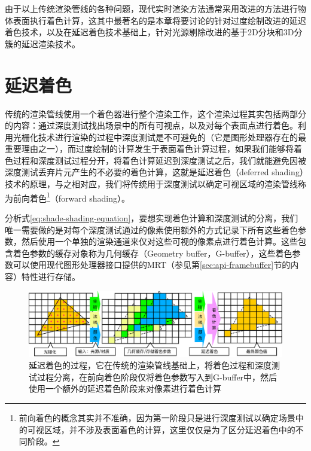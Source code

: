 由于以上传统渲染管线的各种问题，现代实时渲染方法通常采用改进的方法进行物体表面执行着色计算，这其中最著名的是本章将要讨论的针对过度绘制改进的延迟着色技术，以及在延迟着色技术基础上，针对光源剔除改进的基于2D分块和3D分簇的延迟渲染技术。





\section{延迟着色}
传统的渲染管线使用一个着色器进行整个渲染工作，这个渲染过程其实包括两部分的内容：通过深度测试找出场景中的所有可视点，以及对每个表面点进行着色。利用光栅化技术进行渲染的过程中深度测试是不可避免的（它是图形处理器存在的最重要理由之一），而过度绘制的计算发生于表面着色计算过程，如果我们能够将着色过程和深度测试过程分开，将着色计算延迟到深度测试之后，我们就能避免因被深度测试丢弃片元产生的不必要的着色计算，这就是延迟着色（deferred shading）技术的原理，与之相对应，我们将传统用于深度测试以确定可视区域的渲染管线称为前向着色\footnote{前向着色的概念其实并不准确，因为第一阶段只是进行深度测试以确定场景中的可视区域，并不涉及表面着色的计算，这里仅仅是为了区分延迟着色中的不同阶段。}（forward shading）。

分析式\ref{eq:shade-shading-equation}，要想实现着色计算和深度测试的分离，我们唯一需要做的是对每个深度测试通过的像素使用额外的方式记录下所有这些着色参数，然后使用一个单独的渲染通道来仅对这些可视的像素点进行着色计算。这些包含着色参数的缓存对象称为几何缓存（Geometry buffer，G-buffer），这些着色参数可以使用现代图形处理器接口提供的MRT（参见第\ref{sec:api-framebuffer}节的内容）特性进行存储。

\begin{figure}
\begin{fullwidth}
	\includegraphics[width=\thewidth]{figures/shade/deferred-pipeline}
	\caption{延迟着色的过程，它在传统的渲染管线基础上，将着色过程和深度测试过程分离，在前向着色阶段仅将着色参数写入到G-buffer中，然后使用一个额外的延迟着色阶段来对像素进行着色计算}
	\label{f:shade-deferred-pipeline}
\end{fullwidth}
\end{figure}

